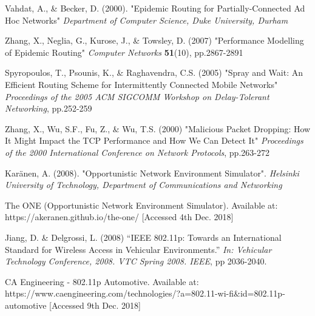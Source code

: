 \documentclass{article}
\begin{document}
\begin{thebibliography}{20}
Vahdat, A., \& Becker, D. (2000).
"Epidemic Routing for Partially-Connected Ad Hoc Networks"
\textit{Department of Computer Science, Duke University, Durham}

Zhang, X., Neglia, G., Kurose, J., \& Towsley, D. (2007)
"Performance Modelling of Epidemic Routing"
\textit{Computer Networks} \textbf{51}(10), pp.2867-2891

Spyropoulos, T., Psounis, K., \& Raghavendra, C.S. (2005)
"Spray and Wait: An Efficient Routing Scheme for
Intermittently Connected Mobile Networks"
\textit{Proceedings of the 2005 ACM SIGCOMM Workshop on Delay-Tolerant Networking}, pp.252-259

Zhang, X., Wu, S.F., Fu, Z., \& Wu, T.S. (2000)
"Malicious Packet Dropping: How It Might Impact the TCP Performance and How
We Can Detect It"
\textit{Proceedings of the 2000 International Conference on Network Protocols}, pp.263-272

Karänen, A. (2008).
"Opportunistic Network Environment Simulator".
\textit{Helsinki University of Technology, Department of Communications and Networking}

The ONE (Opportunistic Network Environment Simulator). Available at: https://akeranen.github.io/the-one/ [Accessed 4th Dec. 2018]

Jiang, D. \& Delgrossi, L. (2008)
``IEEE 802.11p: Towards an International Standard for Wireless Access in Vehicular Environments.'' 
\textit{In: Vehicular Technology Conference, 2008. VTC Spring 2008. IEEE}, pp 2036-2040.

CA Engineering - 802.11p Automotive. Available at: https://www.caengineering.com/technologies/?a=802.11-wi-fi&id=802.11p-automotive [Accessed 9th Dec. 2018]

\end{thebibliography}
 
\end{document}
